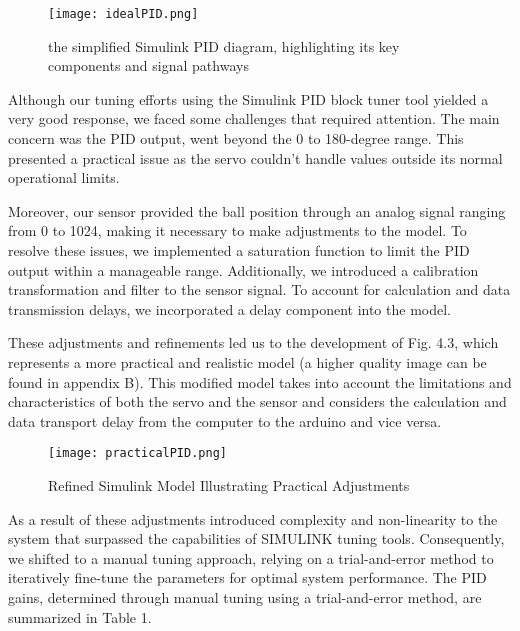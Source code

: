 \begin{figure}[h]
    \centering
    \texttt{[image: idealPID.png]}
    \caption{the simplified Simulink PID diagram, highlighting its key components and signal pathways}
    
\end{figure}

Although our tuning efforts using the Simulink PID block tuner tool yielded a very good response, we faced some challenges that required attention. The main concern was the PID output,  went beyond the 0 to 180-degree range. This presented a practical issue as the servo couldn't handle values outside its normal operational limits.

Moreover, our sensor provided the ball position through an analog signal ranging from 0 to 1024, making it necessary to make adjustments to the model. To resolve these issues, we implemented a saturation function to limit the PID output within a manageable range. Additionally, we introduced a calibration transformation and filter to the sensor signal. To account for calculation and data transmission delays, we incorporated a delay component into the model.

These adjustments and refinements led us to the development of Fig. 4.3, which represents a more practical and realistic model (a higher quality image can be found in appendix B). This modified model takes into account the limitations and characteristics of both the servo and the sensor and considers the calculation and data transport delay from the computer to the arduino and vice versa.

\begin{figure}
    \centering
    \texttt{[image: practicalPID.png]}
    \caption{Refined Simulink Model Illustrating Practical Adjustments}
    
\end{figure}
As a result of these adjustments introduced complexity and non-linearity to the system that surpassed the capabilities of SIMULINK tuning tools. Consequently, we shifted to a manual tuning approach, relying on a trial-and-error method to iteratively fine-tune the parameters for optimal system performance. 
The PID gains, determined through manual tuning using a trial-and-error method, are summarized in Table 1.


